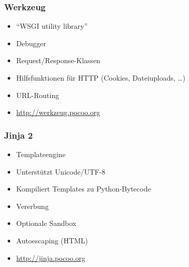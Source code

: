 \documentclass{beamer}
\begin{document}
\begin{frame}
  \frametitle{Werkzeug}
  \begin{itemize}
    \item \enquote{WSGI utility library}
    \item Debugger
    \item Request/Response-Klassen
    \item Hilfsfunktionen für HTTP (Cookies, Dateiuploads, \ldots)
    \item URL-Routing
    \item \url{http://werkzeug.pocoo.org}
  \end{itemize}
\end{frame}

\begin{frame}
  \frametitle{Jinja 2}
  \begin{itemize}
    \item Templateengine
    \item Unterstützt Unicode/UTF-8
    \item Kompiliert Templates zu Python-Bytecode
    \item Vererbung
    \item Optionale Sandbox
    \item Autoescaping (HTML)
    \item \url{http://jinja.pocoo.org}
  \end{itemize}
\end{frame}
\end{document}
